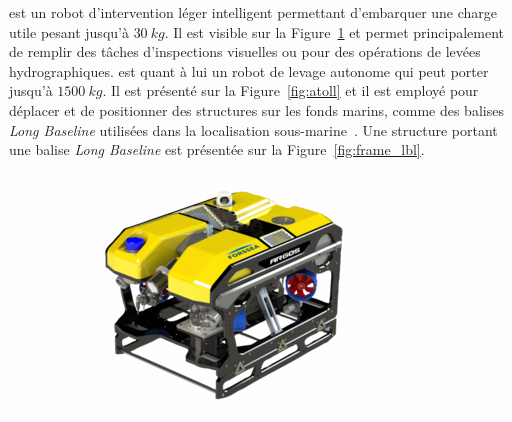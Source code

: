 			\argos{} est un robot d'intervention léger intelligent permettant d'embarquer une charge utile pesant jusqu'à $30\ kg$. Il est visible sur la Figure~\ref{fig:argos} et permet principalement de remplir des tâches d'inspections visuelles ou pour des opérations de levées hydrographiques. \atoll{} est quant à lui un robot de levage autonome qui peut porter jusqu'à $1500\ kg$. Il est présenté sur la Figure~\ref{fig:atoll} et il est employé pour déplacer et de positionner des structures sur les fonds marins, comme des balises \textit{Long Baseline} utilisées dans la localisation sous-marine~\cite{milne1983underwater}. Une structure portant une balise \textit{Long Baseline} est présentée sur la Figure~\ref{fig:frame_lbl}.

			\begin{figure}[!htb]
				\centering
				\begin{subfigure}[t]{0.3\textwidth}
					\centering
					\includegraphics[width=\textwidth]{imgs/argos.png}
					\caption{\argos{}}
					\label{fig:argos}
				\end{subfigure}
				\hfill
				\begin{subfigure}[t]{0.3\textwidth}
					\centering

\end{subfigure}
\end{figure}
